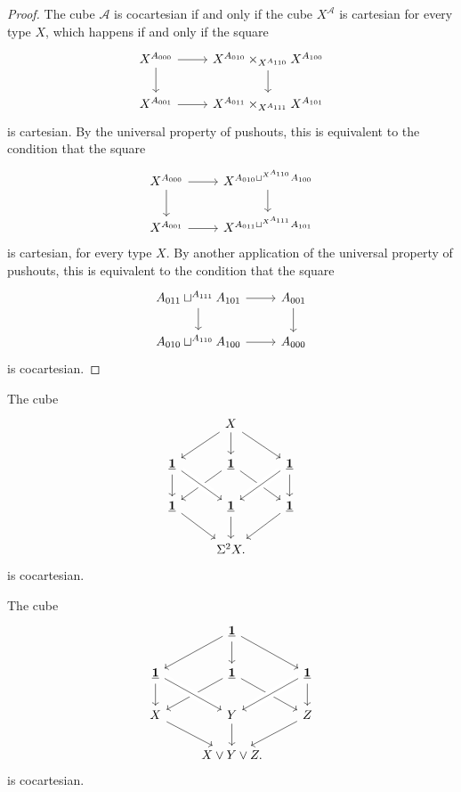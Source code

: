 \begin{proof}
The cube $\mathcal{A}$ is cocartesian if and only if the cube $X^{\mathcal{A}}$ is cartesian for every type $X$, which happens if and only if the square
\begin{equation*}
\begin{tikzcd}
X^{A_{000}} \arrow[r] \arrow[d] & X^{A_{010}}\times_{X^{A_{110}}} X^{A_{100}} \arrow[d] \\
X^{A_{001}} \arrow[r] & X^{A_{011}}\times_{X^{A_{111}}} X^{A_{101}}
\end{tikzcd}
\end{equation*}
is cartesian. By the universal property of pushouts, this is equivalent to the condition that the square
\begin{equation*}
\begin{tikzcd}
X^{A_{000}} \arrow[r] \arrow[d] & X^{A_{010}\sqcup^{X^{A_{110}}}A_{100}} \arrow[d] \\
X^{A_{001}} \arrow[r] & X^{A_{011}\sqcup^{X^{A_{111}}}A_{101}}
\end{tikzcd}
\end{equation*}
is cartesian, for every type $X$. By another application of the universal property of pushouts, this is equivalent to the condition that the square
\begin{equation*}
\begin{tikzcd}
A_{011}\sqcup^{A_{111}} A_{101} \arrow[r] \arrow[d] & A_{001} \arrow[d] \\
A_{010}\sqcup^{A_{110}} A_{100} \arrow[r] & A_{000}
\end{tikzcd}
\end{equation*}
is cocartesian.
\end{proof}

\begin{cor}
The cube
\begin{equation*}
\begin{tikzcd}
& X \arrow[dl] \arrow[d] \arrow[dr] \\
\unit \arrow[d] & \unit \arrow[dl] \arrow[dr] & \unit \arrow[d] \\
\unit \arrow[dr] & \unit \arrow[d] \arrow[from=ul,crossing over] \arrow[from=ur,crossing over] & \unit \arrow[dl] \\
& \Sigma^2 X.
\end{tikzcd}
\end{equation*}
is cocartesian.
\end{cor}

\begin{cor}
The cube
\begin{equation*}
\begin{tikzcd}
& \unit \arrow[dl] \arrow[d] \arrow[dr] \\
\unit \arrow[d] & \unit \arrow[dl] \arrow[dr] & \unit \arrow[d] \\
X \arrow[dr] & Y \arrow[d] \arrow[from=ul,crossing over] \arrow[from=ur,crossing over] & Z \arrow[dl] \\
& X\vee Y\vee Z.
\end{tikzcd}
\end{equation*}
is cocartesian.
\end{cor}

